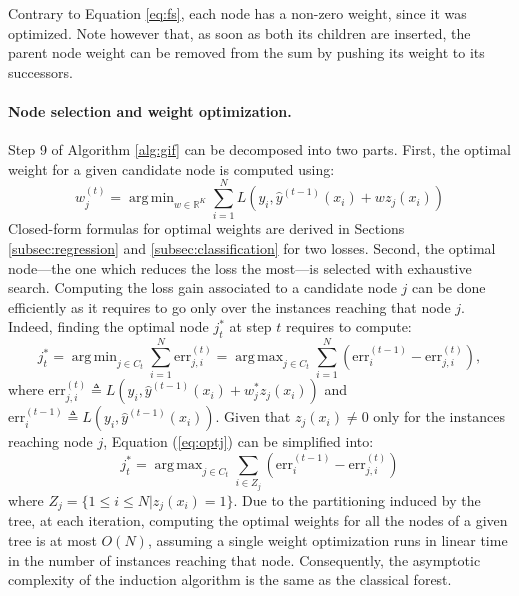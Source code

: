 \documentclass{article}
\DeclareMathOperator*{\argmin}{arg\,min}
\DeclareMathOperator*{\argmax}{arg\,max}
\begin{document}
Contrary to Equation \ref{eq:fs}, each node has a non-zero weight, since it was 
optimized.
Note however that, as soon as both its children are 
inserted, the parent node weight can be removed from the sum by pushing its 
weight to its successors.


\paragraph{Node selection and weight optimization.}
Step 9 of Algorithm \ref{alg:gif} can be decomposed into two parts. First,
the optimal weight for a given candidate node is computed using:
\begin{equation}\label{eq:nodeSel}
  w^{(t)}_j = \argmin_{w\in \mathbb{R}^K} \sum_{i=1}^N L\left(y_i, 
  \hat{y}^{(t-1)}(x_i) + w z_j(x_i)  \right)
\end{equation}
Closed-form formulas for optimal weights are derived in Sections
\ref{subsec:regression} and \ref{subsec:classification} for two losses. Second,
the optimal node---the one which reduces the loss the most---is selected with
exhaustive search. Computing the loss gain associated to a candidate node $j$
can be done efficiently as it requires to go only over the instances reaching
that node $j$. Indeed, finding the optimal node $j_t^*$ at step $t$ requires to 
compute:
\begin{equation}\label{eq:optj}
  j_t^* = \argmin_{j \in C_t} \sum_{i=1}^N \text{err}_{j,i}^{(t)} = \argmax_{j 
  \in C_t} 
  \sum_{i=1}^N (\text{err}^{(t-1)}_i - \text{err}_{j,i}^{(t)}),
\end{equation}
where $\text{err}_{j,i}^{(t)}\triangleq L(y_i,\hat{y}^{(t-1)}(x_i) + w_j^* z_j(x_i))$ and $\text{err}^{(t-1)}_i\triangleq L(y_i,\hat{y}^{(t-1)}(x_i))$.
Given that $z_j(x_i)\neq 0$ only for the instances reaching node $j$, Equation 
(\ref{eq:optj}) can be simplified into:
\begin{equation}\label{eq:optj2}
  j_t^* = \argmax_{j \in C_t} \sum_{i\in Z_j} (\text{err}^{(t-1)}_i - 
  \text{err}_{j,i}^{(t)})
\end{equation}
where $Z_j = \{1 \leq i \leq N | z_j (x_i)=1 \}$. Due to the partitioning
induced by the tree, at each iteration, computing the optimal
weights for all the nodes of a given tree is at most $O(N)$, assuming a single
weight optimization runs in linear time in the number of instances reaching
that node. Consequently, the asymptotic complexity of the induction algorithm 
is the same as the classical forest.
\end{document}
